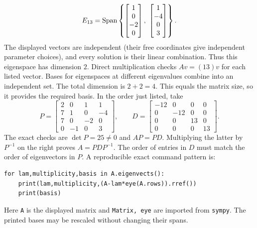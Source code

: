 \[E_{13}=\Span\left\{\begin{bmatrix}1\\0\\-2\\0\end{bmatrix},\ \begin{bmatrix}1\\-4\\0\\3\end{bmatrix}\right\}.\]
The displayed vectors are independent (their free coordinates give independent parameter choices), and every solution is their linear combination. Thus this eigenspace has dimension $2$. Direct multiplication checks $Av=(13)v$ for each listed vector.
Bases for eigenspaces at different eigenvalues combine into an independent set. The total dimension is $2+2=4$.
This equals the matrix size, so it provides the required basis. In the order just listed, take
\[P=\begin{bmatrix}2&0&1&1\\7&1&0&-4\\7&0&-2&0\\0&-1&0&3\end{bmatrix},\qquad D=\begin{bmatrix}-12&0&0&0\\0&-12&0&0\\0&0&13&0\\0&0&0&13\end{bmatrix}.\]
The exact checks are $\det P=25\ne0$ and $AP=PD$. Multiplying the latter by $P^{-1}$ on the right proves $A=PDP^{-1}$. The order of entries in $D$ must match the order of eigenvectors in $P$.
A reproducible exact command pattern is:
\begin{verbatim}
for lam,multiplicity,basis in A.eigenvects():
    print(lam,multiplicity,(A-lam*eye(A.rows)).rref())
    print(basis)
\end{verbatim}
Here \texttt{A} is the displayed matrix and \texttt{Matrix, eye} are imported from \texttt{sympy}. The printed bases may be rescaled without changing their spans.

